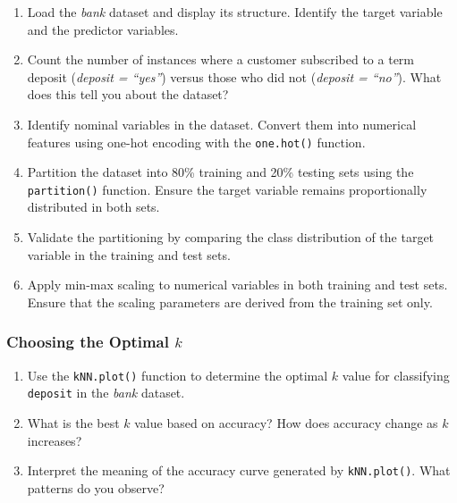 \documentclass[
]{book}
\newcommand{\passthrough}[1]{#1}
\providecommand{\tightlist}{%
  \setlength{\itemsep}{0pt}\setlength{\parskip}{0pt}}
\theoremstyle{definition}
\theoremstyle{definition}
\theoremstyle{definition}
\theoremstyle{definition}
\theoremstyle{remark}
\begin{document}
\begin{enumerate}
\def\labelenumi{\arabic{enumi}.}
\setcounter{enumi}{10}
\tightlist
\item
  Load the \emph{bank} dataset and display its structure. Identify the target variable and the predictor variables.\\
\item
  Count the number of instances where a customer subscribed to a term deposit (\emph{deposit = ``yes''}) versus those who did not (\emph{deposit = ``no''}). What does this tell you about the dataset?\\
\item
  Identify nominal variables in the dataset. Convert them into numerical features using one-hot encoding with the \passthrough{\lstinline!one.hot()!} function.\\
\item
  Partition the dataset into 80\% training and 20\% testing sets using the \passthrough{\lstinline!partition()!} function. Ensure the target variable remains proportionally distributed in both sets.\\
\item
  Validate the partitioning by comparing the class distribution of the target variable in the training and test sets.\\
\item
  Apply min-max scaling to numerical variables in both training and test sets. Ensure that the scaling parameters are derived from the training set only.
\end{enumerate}

\subsubsection*{\texorpdfstring{Choosing the Optimal \(k\)}{Choosing the Optimal k}}\label{choosing-the-optimal-k}

\begin{enumerate}
\def\labelenumi{\arabic{enumi}.}
\setcounter{enumi}{16}
\tightlist
\item
  Use the \passthrough{\lstinline!kNN.plot()!} function to determine the optimal \(k\) value for classifying \passthrough{\lstinline!deposit!} in the \emph{bank} dataset.\\
\item
  What is the best \(k\) value based on accuracy? How does accuracy change as \(k\) increases?
\item
  Interpret the meaning of the accuracy curve generated by \passthrough{\lstinline!kNN.plot()!}. What patterns do you observe?
\end{enumerate}
\end{document}
